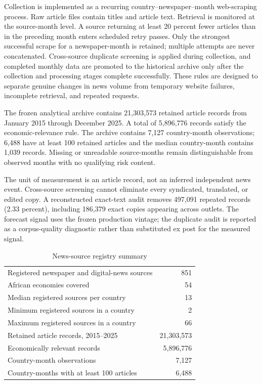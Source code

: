 \documentclass[preprint,12pt,authoryear]{elsarticle}
\begin{document}
Collection is implemented as a recurring country--newspaper--month web-scraping process. Raw article files contain titles and article text. Retrieval is monitored at the source-month level. A source returning at least 20 percent fewer articles than in the preceding month enters scheduled retry passes. Only the strongest successful scrape for a newspaper-month is retained; multiple attempts are never concatenated. Cross-source duplicate screening is applied during collection, and completed monthly data are promoted to the historical archive only after the collection and processing stages complete successfully. These rules are designed to separate genuine changes in news volume from temporary website failures, incomplete retrieval, and repeated requests.

The frozen analytical archive contains 21,303,573 retained article records from January 2015 through December 2025. A total of 5,896,776 records satisfy the economic-relevance rule. The archive contains 7,127 country-month observations; 6,488 have at least 100 retained articles and the median country-month contains 1,039 records. Missing or unreadable source-months remain distinguishable from observed months with no qualifying risk content.

The unit of measurement is an article record, not an inferred independent news event. Cross-source screening cannot eliminate every syndicated, translated, or edited copy. A reconstructed exact-text audit removes 497,091 repeated records (2.33 percent), including 186,379 exact copies appearing across outlets. The forecast signal uses the frozen production vintage; the duplicate audit is reported as a corpus-quality diagnostic rather than substituted ex post for the measured signal.

\begin{table}[htbp]
\centering
\caption{News-source registry summary}
\begin{tabular}{lr}
\toprule
Registered newspaper and digital-news sources & 851\\
African economies covered & 54\\
Median registered sources per country & 13\\
Minimum registered sources in a country & 2\\
Maximum registered sources in a country & 66\\
Retained article records, 2015--2025 & 21,303,573\\
Economically relevant records & 5,896,776\\
Country-month observations & 7,127\\
Country-months with at least 100 articles & 6,488\\
\bottomrule
\end{tabular}
\end{table}
\end{document}
